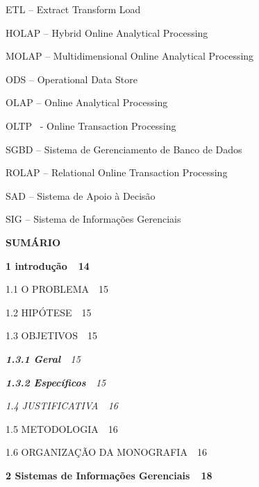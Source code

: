 \documentclass[a4paper]{article}
\newcommand\textstyleTtuloChar[1]{\textsf{\textbf{#1}}}
\begin{document}
\foreignlanguage{english}{\textsf{ETL -- Extract Transform Load}}

\foreignlanguage{english}{\textsf{HOLAP -- Hybrid Online Analytical Processing}}

\foreignlanguage{english}{\textsf{MOLAP -- Multidimensional Online Analytical Processing}}

{\sffamily
ODS -- Operational Data Store}

\foreignlanguage{english}{\textsf{OLAP -- Online Analytical Processing}}

\foreignlanguage{portuges}{\textsf{OLTP \ {}- Online Transaction Processing}}

\foreignlanguage{portuges}{\textsf{SGBD -- Sistema de Gerenciamento de Banco de Dados}}

\foreignlanguage{english}{\textsf{ROLAP -- Relational Online Transaction Processing}}

{\sffamily
SAD -- Sistema de Apoio \`a Decis\~ao}

{
\textsf{SIG -- Sistema de Informa\c{c}\~oes Gerenciais}}

\clearpage\setcounter{page}{1}\pagestyle{Convertii}
{\centering{}\sffamily\bfseries
SUM\'ARIO
\par}


\bigskip

{\sffamily\bfseries
\textstyleTtuloChar{1 introdu\c{c}\~ao\textmd{\ \ }\foreignlanguage{portuges}{\textmd{14}}}}

{\sffamily\scshape
1.1 O PROBLEMA\ \ 15}

{\sffamily\scshape
1.2 HIP\'OTESE\ \ 15}

{\sffamily\scshape
1.3 OBJETIVOS\ \ 15}

{\sffamily\itshape
\textbf{\textup{1.3.1 Geral}}\textup{\ \ 15}}

{\sffamily\itshape
\textbf{\textup{1.3.2 Espec\'ificos}}\textup{\ \ 15}}

{\sffamily\itshape
\textup{1.4 JUSTIFICATIVA\ \ 16}}

{\sffamily\scshape
1.5 METODOLOGIA\ \ 16}

{\sffamily\scshape
1.6 ORGANIZA\c{C}\~AO DA MONOGRAFIA\ \ 16}

{\sffamily\bfseries
\textstyleTtuloChar{2 Sistemas de Informa\c{c}\~oes Gerenciais\textmd{\ \ }\foreignlanguage{portuges}{\textmd{18}}}}
\end{document}

